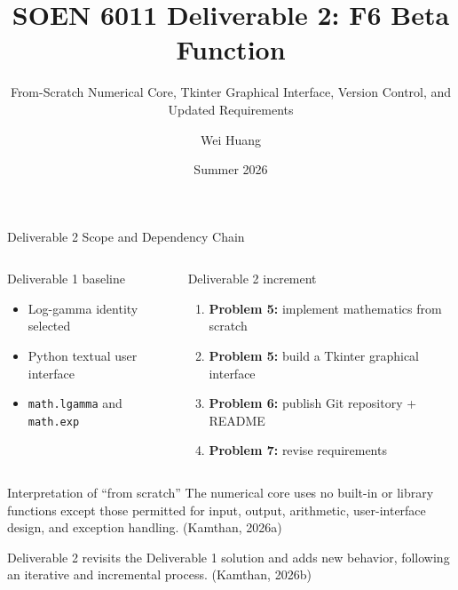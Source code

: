 \documentclass[aspectratio=169,10pt]{beamer}
\title{SOEN 6011 Deliverable 2: F6 Beta Function}
\subtitle{From-Scratch Numerical Core, Tkinter Graphical Interface, Version Control, and Updated Requirements}
\author{Wei Huang}
\institute{Concordia University}
\date{Summer 2026}
\newcommand{\code}[1]{\texttt{#1}}
\newcommand{\smallcite}[1]{{\scriptsize (#1)}}
\begin{document}
\begin{frame}
  \titlepage
\end{frame}

\begin{frame}{Deliverable 2 Scope and Dependency Chain}
  \begin{columns}[T]
    \begin{block}{Deliverable 1 baseline}
      \begin{itemize}
        \item Log-gamma identity selected
        \item Python textual user interface
        \item \code{math.lgamma} and \code{math.exp}
      \end{itemize}
    \end{block}

    \begin{block}{Deliverable 2 increment}
      \begin{enumerate}
        \item \textbf{Problem 5:} implement mathematics from scratch
        \item \textbf{Problem 5:} build a Tkinter graphical interface
        \item \textbf{Problem 6:} publish Git repository + README
        \item \textbf{Problem 7:} revise requirements
      \end{enumerate}
    \end{block}
  \end{columns}

  \vspace{0.5em}
  \begin{block}{Interpretation of ``from scratch''}
    The numerical core uses no built-in or library functions except those
    permitted for input, output, arithmetic, user-interface design, and
    exception handling. \smallcite{Kamthan, 2026a}
  \end{block}

  \scriptsize
  Deliverable 2 revisits the Deliverable 1 solution and adds new behavior,
  following an iterative and incremental process. \smallcite{Kamthan, 2026b}
\end{frame}
\end{document}
